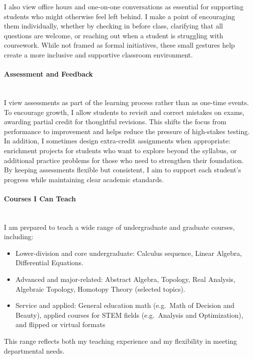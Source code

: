 \documentclass[11pt]{article}
\begin{document}
I also view office hours and one-on-one conversations as essential for supporting students who might otherwise feel left behind. 
I make a point of encouraging them individually, whether by checking in before class, clarifying that all questions are welcome, or reaching out when a student is struggling with coursework.
While not framed as formal initiatives, these small gestures help create a more inclusive and supportive classroom environment.


\paragraph{Assessment and Feedback}\quad \\
I view assessments as part of the learning process rather than as one-time events. To encourage growth, I allow students to revisit and correct mistakes on exams, awarding partial credit for thoughtful revisions. This shifts the focus from performance to improvement and helps reduce the pressure of high-stakes testing. In addition, I sometimes design extra-credit assignments when appropriate: enrichment projects for students who want to explore beyond the syllabus, or additional practice problems for those who need to strengthen their foundation. By keeping assessments flexible but consistent, I aim to support each student’s progress while maintaining clear academic standards.


\paragraph{Courses I Can Teach}\quad \\
I am prepared to teach a wide range of undergraduate and graduate courses, including:
\begin{itemize}
 \item Lower-division and core undergraduate: Calculus sequence, Linear Algebra, Differential Equations.
 \item Advanced and major-related: Abstract Algebra, Topology, Real Analysis, Algebraic Topology, Homotopy Theory (selected topics).
  \item Service and applied: General education math (e.g.\ Math of Decision and Beauty), applied courses for STEM fields (e.g.\ Analysis and Optimization), and flipped or virtual formats
\end{itemize}
This range reflects both my teaching experience and my flexibility in meeting departmental needs.
\end{document}
